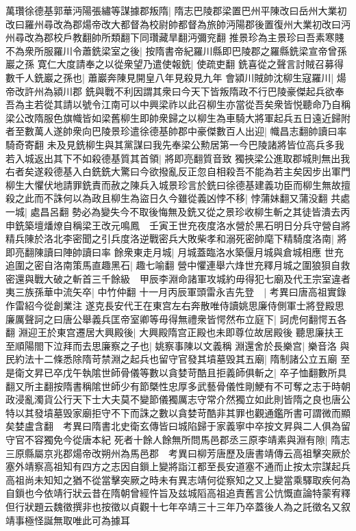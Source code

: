 萬瓚徐德基郭華沔陽張繡等謀據郡叛隋|{
	隋志巴陵郡梁置巴州平陳改曰岳州大業初改曰羅州尋改為郡煬帝改大都督為校尉帥都督為旅帥沔陽郡後置復州大業初改曰沔州尋改為郡校戶教翻帥所類翻下同瓚藏旱翻沔彌兖翻}
推景珍為主景珍曰吾素寒賤不為衆所服羅川令蕭銑梁室之後|{
	按隋書帝紀羅川縣即巴陵郡之羅縣銑梁宣帝曾孫巖之孫}
寛仁大度請奉之以從衆望乃遣使報銑|{
	使疏吏翻}
銑喜從之聲言討賊召募得數千人銑巖之孫也|{
	蕭巖奔陳見開皇八年見殺見九年}
會潁川賊帥沈柳生寇羅川|{
	煬帝改許州為潁川郡}
銑與戰不利因謂其衆曰今天下皆叛隋政不行巴陵豪傑起兵欲奉吾為主若從其請以號令江南可以中興梁祚以此召柳生亦當從吾矣衆皆悦聽命乃自稱梁公改隋服色旗幟皆如梁舊柳生即帥衆歸之以柳生為車騎大將軍起兵五日遠近歸附者至數萬人遂帥衆向巴陵景珍遣徐德基帥郡中豪傑數百人出迎|{
	幟昌志翻帥讀曰率騎奇寄翻}
未及見銑柳生與其黨謀曰我先奉梁公勲居第一今巴陵諸將皆位高兵多我若入城返出其下不如殺德基質其首領|{
	將即亮翻質音致}
獨挾梁公進取郡城則無出我右者矣遂殺德基入白銑銑大驚曰今欲撥亂反正忽自相殺吾不能為若主矣因步出軍門柳生大懼伏地請罪銑責而赦之陳兵入城景珍言於銑曰徐德基建義功臣而柳生無故擅殺之此而不誅何以為政且柳生為盜日久今雖從義凶悖不移|{
	悖蒲妹翻又蒲没翻}
共處一城|{
	處昌呂翻}
勢必為變失今不取後悔無及銑又從之景珍收柳生斬之其徒皆潰去丙申銑築壇燔燎自稱梁王改元鳴鳳　壬寅王世充夜度洛水營於黑石明日分兵守營自將精兵陳於洛北李密聞之引兵度洛逆戰密兵大敗柴孝和溺死密帥麾下精騎度洛南|{
	將即亮翻陳讀曰陣帥讀曰率}
餘衆東走月城|{
	月城蓋臨洛水築偃月城與倉城相應}
世充追圍之密自洛南策馬直趣黑石|{
	趣七喻翻}
營中懼連舉六烽世充釋月城之圍狼狽自救密還與戰大破之斬首三千餘級　甲辰李淵命諸軍攻城約毋得犯七廟及代王宗室違者夷三族孫華中流矢卒|{
	中竹仲翻}
十一月丙辰軍頭雷永吉先登　|{
	考異曰唐高祖實錄作雷紹今從創業注}
遂克長安代王在東宫左右奔散唯侍讀姚思廉侍側軍士將登殿思廉厲聲訶之曰唐公舉義兵匡帝室卿等毋得無禮衆皆愕然布立庭下|{
	訶虎何翻愕五各翻}
淵迎王於東宫遷居大興殿後|{
	大興殿隋宫正殿也未即尊位故居殿後}
聽思廉扶王至順陽閤下泣拜而去思廉察之子也|{
	姚察事陳以文義稱}
淵還舍於長樂宫|{
	樂音洛}
與民約法十二條悉除隋苛禁淵之起兵也留守官發其墳墓毁其五廟|{
	隋制諸公立五廟}
至是衛文昇已卒戊午執隂世師骨儀等數以貪婪苛酷且拒義師俱斬之|{
	卒子恤翻數所具翻又所主翻按隋書稱隂世師少有節槩性忠厚多武藝骨儀性剛鯁有不可奪之志于時朝政浸亂濁貨公行天下士大夫莫不變節儀獨厲志守常介然獨立如此則皆隋之良也唐公特以其發墳墓毁家廟拒守不下而誅之數以貪婪苛酷非其罪也觀通鑑所書可謂微而顯矣婪盧含翻　考異曰隋書北史衛玄傳皆曰城陷歸于家義寧中卒按文昇與二人俱為留守官不容獨免今從唐本紀}
死者十餘人餘無所問馬邑郡丞三原李靖素與淵有隙|{
	隋志三原縣屬京兆郡煬帝改朔州為馬邑郡　考異曰柳芳唐歷及唐書靖傳云高祖擊突厥於塞外靖察高祖知有四方之志因自鎻上變將詣江都至長安道塞不通而止按太宗謀起兵高祖尚未知知之猶不從當擊突厥之時未有異志靖何從察知之又上變當乘驛取疾何為自鎻也今依靖行狀云昔在隋朝曾經忤旨及兹城䧟高祖追責舊言公忼慨直論特蒙宥釋但行狀題云魏徵撰非也按徵以貞觀十七年卒靖三十三年乃卒蓋後人為之託徵名又叙靖事極怪誕無取唯此可為據耳}
